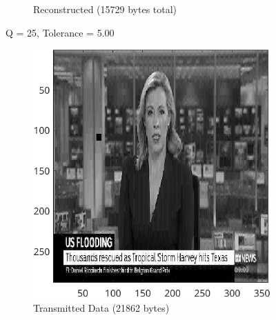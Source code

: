 \documentclass{article}
\begin{document}
\begin{figure}[ht]
\begin{subfigure}[t]{0.45\textwidth}
			\caption{Reconstructed (15729 bytes total)}
			\label{fig:2B_Input2Reconstructed}

		\end{subfigure}

		\caption{Q = 25, Tolerance = 5.00}
		\label{fig:2B_Input2}
	\end{figure}

		\begin{figure}[ht]
		\centering
			\begin{subfigure}[t]{0.45\textwidth}
			\centering

			\includegraphics[width=\textwidth]{2B_Input3TD}

			\caption{Transmitted Data (21862 bytes)}
			\label{fig:2B_Input3TD}

		\end{subfigure}
		\hspace{1cm}
		\begin{subfigure}[t]{0.45\textwidth}
			\centering


\end{subfigure}
\end{figure}
\end{document}
